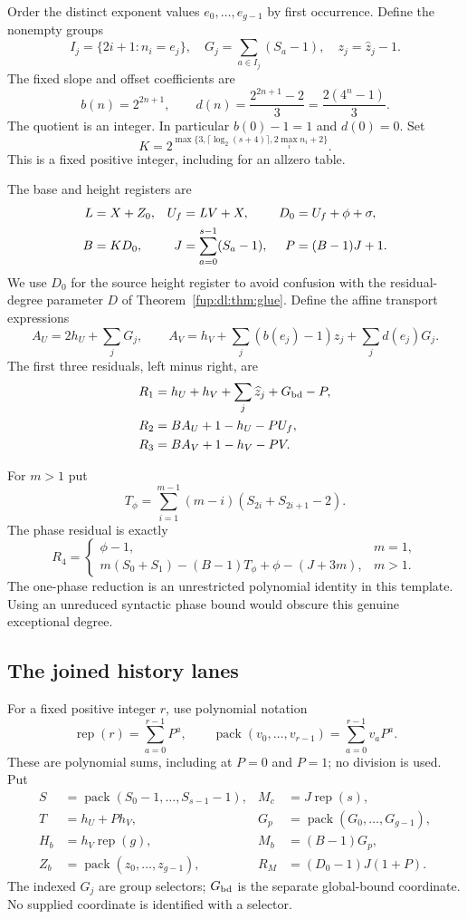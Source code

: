 \documentclass[11pt,letterpaper]{article}
\theoremstyle{definition}\newtheorem{definition}[theorem]{Definition}
\theoremstyle{remark}\newtheorem{remark}[theorem]{Remark}
\newcommand{\rep}{\operatorname{rep}}
\newcommand{\pack}{\operatorname{pack}}
\begin{document}
Order the distinct exponent values $e_0,\ldots,e_{g-1}$ by first occurrence. Define the nonempty groups
\[
 I_j=\{2i+1:n_i=e_j\},\quad
 G_j=\sum_{a\in I_j}(S_a-1),\quad z_j=\widehat z_j-1.
\]
The fixed slope and offset coefficients are
\[
 b(n)=2^{2n+1},\qquad d(n)=\frac{2^{2n+1}-2}{3}
       =\frac{2(4^n-1)}3.
\]
The quotient is an integer. In particular $b(0)-1=1$ and $d(0)=0$. Set
\begin{equation}\label{fup:dl:eq:K}
 K=2^{\max\{3,\lceil\log_2(s+4)\rceil,2\max_i n_i+2\}}.
\end{equation}
This is a fixed positive integer, including for an allzero table.

The base and height registers are
\begin{align}
 L&=X+Z_0,& U_f&=LV+X,& D_0&=U_f+\phi+\sigma,\notag\\
 B&=KD_0,& J&=\sum_{a=0}^{s-1}(S_a-1),& P&=(B-1)J+1.\label{fup:dl:eq:base}
\end{align}
We use $D_0$ for the source height register to avoid confusion with the residual-degree parameter $D$ of Theorem~\ref{fup:dl:thm:glue}. Define the affine transport expressions
\[
 A_U=2h_U+\sum_jG_j,\qquad
 A_V=h_V+\sum_j(b(e_j)-1)z_j+\sum_jd(e_j)G_j.
\]
The first three residuals, left minus right, are
\begin{align}
 R_1&=h_U+h_V+\sum_j\widehat z_j+G_{\rm bd}-P,\notag\\
 R_2&=BA_U+1-h_U-PU_f,\notag\\
 R_3&=BA_V+1-h_V-PV.\label{fup:dl:eq:transport}
\end{align}

For $m>1$ put
\[
 T_\phi=\sum_{i=1}^{m-1}(m-i)(S_{2i}+S_{2i+1}-2).
\]
The phase residual is exactly
\begin{equation}\label{fup:dl:eq:phase}
 R_4=\begin{cases}
 \phi-1,&m=1,\\
 m(S_0+S_1)-(B-1)T_\phi+\phi-(J+3m),&m>1.
 \end{cases}
\end{equation}
The one-phase reduction is an unrestricted polynomial identity in this template. Using an unreduced syntactic phase bound would obscure this genuine exceptional degree.

\subsection{The joined history lanes}
For a fixed positive integer $r$, use polynomial notation
\[
 \rep(r)=\sum_{a=0}^{r-1}P^a,\qquad
 \pack(v_0,\ldots,v_{r-1})=\sum_{a=0}^{r-1}v_aP^a.
\]
These are polynomial sums, including at $P=0$ and $P=1$; no division is used. Put
\begin{align*}
 S&=\pack(S_0-1,\ldots,S_{s-1}-1),&M_c&=J\rep(s),\\
 T&=h_U+Ph_V,&G_p&=\pack(G_0,\ldots,G_{g-1}),\\
 H_b&=h_V\rep(g),&M_b&=(B-1)G_p,\\
 Z_b&=\pack(z_0,\ldots,z_{g-1}),&R_M&=(D_0-1)J(1+P).
\end{align*}
The indexed $G_j$ are group selectors; $G_{\rm bd}$ is the separate global-bound coordinate. No supplied coordinate is identified with a selector.
\end{document}
